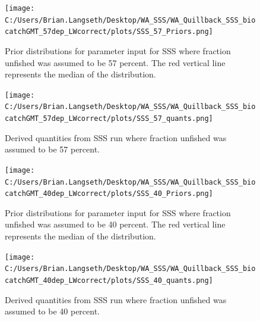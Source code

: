 \documentclass[11pt,
  english,
  letterpaper,
]{article}
\begin{document}
\tagmcend\tagstructend


\begin{figure}
\centering
\texttt{[image: C:/Users/Brian.Langseth/Desktop/WA\_SSS/WA\_Quillback\_SSS\_biocatchGMT\_57dep\_LWcorrect/plots/SSS\_57\_Priors.png]}
\caption{Prior distributions for parameter input for SSS where fraction unfished was assumed to be 57 percent. The red vertical line represents the median of the distribution.\label{fig:sss-prior-57}}
\end{figure}

\tagmcend\tagstructend

\newpage


\begin{figure}
\centering
\texttt{[image: C:/Users/Brian.Langseth/Desktop/WA\_SSS/WA\_Quillback\_SSS\_biocatchGMT\_57dep\_LWcorrect/plots/SSS\_57\_quants.png]}
\caption{Derived quantities from SSS run where fraction unfished was assumed to be 57 percent.\label{fig:sss-quant-57}}
\end{figure}

\tagmcend\tagstructend

\newpage


\begin{figure}
\centering
\texttt{[image: C:/Users/Brian.Langseth/Desktop/WA\_SSS/WA\_Quillback\_SSS\_biocatchGMT\_40dep\_LWcorrect/plots/SSS\_40\_Priors.png]}
\caption{Prior distributions for parameter input for SSS where fraction unfished was assumed to be 40 percent. The red vertical line represents the median of the distribution.\label{fig:sss-prior-40}}
\end{figure}

\tagmcend\tagstructend

\newpage


\begin{figure}
\centering
\texttt{[image: C:/Users/Brian.Langseth/Desktop/WA\_SSS/WA\_Quillback\_SSS\_biocatchGMT\_40dep\_LWcorrect/plots/SSS\_40\_quants.png]}
\caption{Derived quantities from SSS run where fraction unfished was assumed to be 40 percent.\label{fig:sss-quant-40}}
\end{figure}
\end{document}
